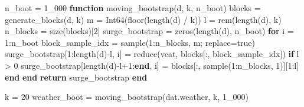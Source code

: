 \documentclass[
  letterpaper,
  DIV=11,
  numbers=noendperiod]{scrartcl}
\newenvironment{Shaded}{\begin{snugshade}}{\end{snugshade}}
\newcommand{\ConstantTok}[1]{\textcolor[rgb]{0.56,0.35,0.01}{#1}}
\newcommand{\ControlFlowTok}[1]{\textcolor[rgb]{0.00,0.23,0.31}{\textbf{#1}}}
\newcommand{\FloatTok}[1]{\textcolor[rgb]{0.68,0.00,0.00}{#1}}
\newcommand{\FunctionTok}[1]{\textcolor[rgb]{0.28,0.35,0.67}{#1}}
\newcommand{\KeywordTok}[1]{\textcolor[rgb]{0.00,0.23,0.31}{\textbf{#1}}}
\newcommand{\NormalTok}[1]{\textcolor[rgb]{0.00,0.23,0.31}{#1}}
\newcommand{\OperatorTok}[1]{\textcolor[rgb]{0.37,0.37,0.37}{#1}}
\begin{document}
\begin{Shaded}
\begin{Highlighting}[]
\NormalTok{n\_boot }\OperatorTok{=} \FloatTok{1\_000}
\KeywordTok{function} \FunctionTok{moving\_bootstrap}\NormalTok{(d, k, n\_boot)}
\NormalTok{    blocks }\OperatorTok{=} \FunctionTok{generate\_blocks}\NormalTok{(d, k)}
\NormalTok{    m }\OperatorTok{=} \FunctionTok{Int64}\NormalTok{(}\FunctionTok{floor}\NormalTok{(}\FunctionTok{length}\NormalTok{(d) }\OperatorTok{/}\NormalTok{ k))}
\NormalTok{    l }\OperatorTok{=} \FunctionTok{rem}\NormalTok{(}\FunctionTok{length}\NormalTok{(d), k)}
\NormalTok{    n\_blocks }\OperatorTok{=} \FunctionTok{size}\NormalTok{(blocks)[}\FloatTok{2}\NormalTok{]}
\NormalTok{    surge\_bootstrap }\OperatorTok{=} \FunctionTok{zeros}\NormalTok{(}\FunctionTok{length}\NormalTok{(d), n\_boot)}
    \ControlFlowTok{for}\NormalTok{ i }\OperatorTok{=} \FloatTok{1}\OperatorTok{:}\NormalTok{n\_boot}
\NormalTok{        block\_sample\_idx }\OperatorTok{=} \FunctionTok{sample}\NormalTok{(}\FloatTok{1}\OperatorTok{:}\NormalTok{n\_blocks, m; replace}\OperatorTok{=}\ConstantTok{true}\NormalTok{)}
\NormalTok{        surge\_bootstrap[}\FloatTok{1}\OperatorTok{:}\FunctionTok{length}\NormalTok{(d)}\OperatorTok{{-}}\NormalTok{l, i] }\OperatorTok{=} \FunctionTok{reduce}\NormalTok{(vcat, blocks[}\OperatorTok{:}\NormalTok{, block\_sample\_idx])}
        \ControlFlowTok{if}\NormalTok{ l }\OperatorTok{\textgreater{}} \FloatTok{0}
\NormalTok{            surge\_bootstrap[}\FunctionTok{length}\NormalTok{(d)}\OperatorTok{{-}}\NormalTok{l}\OperatorTok{+}\FloatTok{1}\OperatorTok{:}\KeywordTok{end}\NormalTok{, i] }\OperatorTok{=}\NormalTok{ blocks[}\OperatorTok{:}\NormalTok{, }\FunctionTok{sample}\NormalTok{(}\FloatTok{1}\OperatorTok{:}\NormalTok{n\_blocks, }\FloatTok{1}\NormalTok{)][}\FloatTok{1}\OperatorTok{:}\NormalTok{l]}
        \ControlFlowTok{end}
    \ControlFlowTok{end}
    \ControlFlowTok{return}\NormalTok{ surge\_bootstrap}
\KeywordTok{end}

\NormalTok{k }\OperatorTok{=} \FloatTok{20}
\NormalTok{weather\_boot }\OperatorTok{=} \FunctionTok{moving\_bootstrap}\NormalTok{(dat.weather, k, }\FloatTok{1\_000}\NormalTok{)}
\end{Highlighting}
\end{Shaded}
\end{document}
